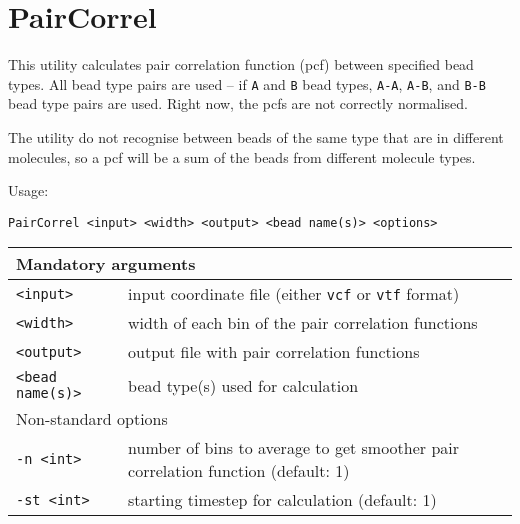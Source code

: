 \section{PairCorrel} \label{sec:PairCorrel}

This utility calculates pair correlation function (pcf) between specified
bead types. All bead type pairs are used -- if \texttt{A} and \texttt{B}
bead types, \texttt{A-A}, \texttt{A-B}, and \texttt{B-B} bead type pairs
are used. Right now, the pcfs are not correctly normalised.

The utility do not recognise between beads of the same type that are in
different molecules, so a pcf will be a sum of the beads from different
molecule types.

Usage:

\vspace{1em}
\noindent
\texttt{PairCorrel <input> <width> <output> <bead name(s)> <options>}

\noindent
\begin{longtable}{p{}p{}}
  \toprule
  \multicolumn{2}{l}{Mandatory arguments} \\
  \midrule
  \texttt{<input>} & input coordinate file (either \texttt{vcf} or
    \texttt{vtf} format) \\
  \texttt{<width>} & width of each bin of the pair correlation functions \\
  \texttt{<output>} & output file with pair correlation functions \\
  \texttt{<bead name(s)>} & bead type(s) used for calculation \\
  \toprule
  \multicolumn{2}{l}{Non-standard options} \\
  \midrule
  \texttt{-n <int>} & number of bins to average to get smoother pair
    correlation function (default: 1) \\
  \texttt{-st <int>} & starting timestep for calculation (default: 1) \\
  \bottomrule
\end{longtable}

